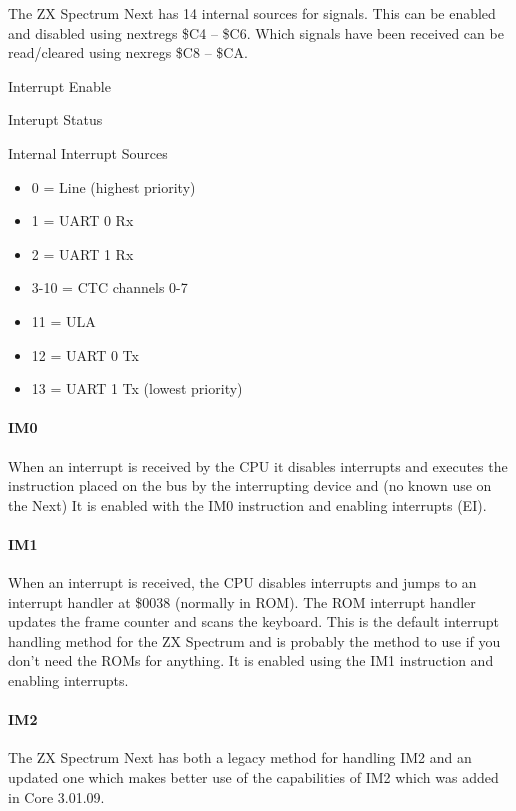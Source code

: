 The ZX Spectrum Next has 14 internal sources for 
signals. This can be enabled and disabled using nextregs \$C4 --
\$C6. Which signals have been received can be read/cleared using
nexregs \$C8 -- \$CA.

Interrupt Enable




Interupt Status




Internal Interrupt Sources
\begin{itemize}
\item[] 0 = Line (highest priority)
\item[] 1 = UART 0 Rx
\item[] 2 = UART 1 Rx
\item[] 3-10 = CTC channels 0-7
\item[] 11 = ULA
\item[] 12 = UART 0 Tx
\item[] 13 = UART 1 Tx (lowest priority)
\end{itemize}

\paragraph{IM0}
When an interrupt is received by the CPU it disables interrupts and
executes the instruction placed on the bus by the interrupting device
and (no known use on the Next) It is enabled with the IM0 instruction
and enabling interrupts (EI).

\paragraph{IM1}
When an interrupt is received, the CPU disables interrupts and jumps
to an interrupt handler at \$0038 (normally in ROM). The ROM interrupt
handler updates the frame counter and scans the keyboard. This is the
default interrupt handling method for the ZX Spectrum and is probably
the method to use if you don’t need the ROMs for anything. It is
enabled using the IM1 instruction and enabling interrupts.

\paragraph{IM2}
The ZX Spectrum Next has both a legacy method for handling IM2 and an
updated one which makes better use of the capabilities of IM2 which
was added in Core 3.01.09.

